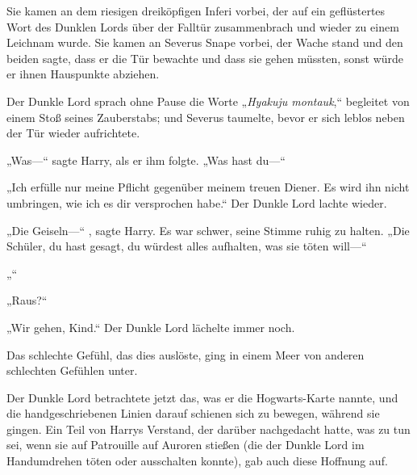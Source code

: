 Sie kamen an dem riesigen dreiköpfigen Inferi vorbei, der auf ein geflüstertes Wort des Dunklen Lords über der Falltür zusammenbrach und wieder zu einem Leichnam wurde.
Sie kamen an Severus Snape vorbei, der Wache stand und den beiden sagte, dass er die Tür bewachte und dass sie gehen müssten, sonst würde er ihnen Hauspunkte abziehen.

Der Dunkle Lord sprach ohne Pause die Worte „\emph{Hyakuju montauk},“ begleitet von einem Stoß seines Zauberstabs; und Severus taumelte, bevor er sich leblos neben der Tür wieder aufrichtete.

„Was—“ sagte Harry, als er ihm folgte. „Was hast du—“

„Ich erfülle nur meine Pflicht gegenüber meinem treuen Diener. Es wird ihn nicht umbringen, wie ich es dir versprochen habe.“
Der Dunkle Lord lachte wieder.

„Die Geiseln—“ , sagte Harry.
Es war schwer, seine Stimme ruhig zu halten.
„Die Schüler, du hast gesagt, du würdest alles aufhalten, was sie töten will—“

„“

„Raus?“

„Wir gehen, Kind.“ Der Dunkle Lord lächelte immer noch.

Das schlechte Gefühl, das dies auslöste, ging in einem Meer von anderen schlechten Gefühlen unter.

Der Dunkle Lord betrachtete jetzt das, was er die Hogwarts-Karte nannte, und die handgeschriebenen Linien darauf schienen sich zu bewegen, während sie gingen. Ein Teil von Harrys Verstand, der darüber nachgedacht hatte, was zu tun sei, wenn sie auf Patrouille auf Auroren stießen (die der Dunkle Lord im Handumdrehen töten oder ausschalten konnte), gab auch diese Hoffnung auf.

